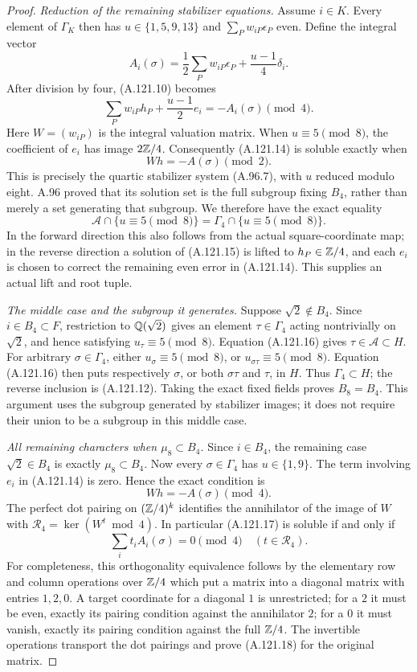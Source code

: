 \begin{proof}
\emph{Reduction of the remaining stabilizer equations.}
Assume $i\in K$.
Every element of $\Gamma_K$ then has
$u\in\{1,5,9,13\}$ and
$\sum_Pw_{iP}\epsilon_P$ even.
Define the integral vector
\[
       A_i(\sigma)
       =\frac12\sum_Pw_{iP}\epsilon_P
                    +\frac{u-1}{4}\delta_i .
\tag{A.121.13}
\]
After division by four, (A.121.10) becomes
\[
       \sum_Pw_{iP}h_P+\frac{u-1}{2}e_i
                      =-A_i(\sigma)\pmod4 .
\tag{A.121.14}
\]
Here $W=(w_{iP})$ is the integral valuation matrix.
When $u\equiv5\pmod8$, the coefficient of $e_i$
has image $2\mathbb Z/4$.
Consequently (A.121.14) is soluble exactly when
\[
                             Wh=-A(\sigma)\pmod2.
\tag{A.121.15}
\]
This is precisely the quartic stabilizer system
(A.96.7), with $u$ reduced modulo eight.
A.96 proved that its solution set is the full subgroup
fixing $B_4$, rather than merely a set generating that
subgroup.
We therefore have the exact equality
\[
 \mathcal A\cap\{u\equiv5\pmod8\}
          =\Gamma_4\cap\{u\equiv5\pmod8\}.
\tag{A.121.16}
\]
In the forward direction this also follows from the
actual square-coordinate map; in the reverse direction
a solution of (A.121.15) is lifted to $h_P\in\mathbb Z/4$,
and each $e_i$ is chosen to correct the remaining even
error in (A.121.14).
This supplies an actual lift and root tuple.

\emph{The middle case and the subgroup it generates.}
Suppose $\sqrt2\notin B_4$.
Since $i\in B_4\subset F$, restriction to $\mathbb Q(\sqrt2)$
gives an element $\tau\in\Gamma_4$ acting nontrivially
on $\sqrt2$, and hence satisfying $u_\tau\equiv5\pmod8$.
Equation (A.121.16) gives $\tau\in\mathcal A\subset H$.
For arbitrary $\sigma\in\Gamma_4$, either
$u_\sigma\equiv5\pmod8$, or
$u_{\sigma\tau}\equiv5\pmod8$.
Equation (A.121.16) then puts respectively $\sigma$, or
both $\sigma\tau$ and $\tau$, in $H$.
Thus $\Gamma_4\subset H$; the reverse inclusion is
(A.121.12).
Taking the exact fixed fields proves $B_8=B_4$.
This argument uses the subgroup generated by stabilizer
images; it does not require their union to be a subgroup
in this middle case.

\emph{All remaining characters when $\mu_8\subset B_4$.}
Since $i\in B_4$, the remaining case
$\sqrt2\in B_4$ is exactly $\mu_8\subset B_4$.
Now every $\sigma\in\Gamma_4$ has $u\in\{1,9\}$.
The term involving $e_i$ in (A.121.14) is zero.
Hence the exact condition is
\[
                         Wh=-A(\sigma)\pmod4 .
\tag{A.121.17}
\]
The perfect dot pairing on $(\mathbb Z/4)^k$ identifies the
annihilator of the image of $W$ with
$\mathcal R_4=\ker(W^t\bmod4)$.
In particular (A.121.17) is soluble if and only if
\[
                  \sum_i t_iA_i(\sigma)=0\pmod4
                                  \quad(t\in\mathcal R_4).
\tag{A.121.18}
\]
For completeness, this orthogonality equivalence follows
by the elementary row and column operations over $\mathbb Z/4$
which put a matrix into a diagonal matrix with entries
$1,2,0$.
A target coordinate for a diagonal $1$ is unrestricted;
for a $2$ it must be even, exactly its pairing condition
against the annihilator $2$; for a $0$ it must vanish,
exactly its pairing condition against the full
$\mathbb Z/4$.
The invertible operations transport the dot pairings
and prove (A.121.18) for the original matrix.


\end{proof}
